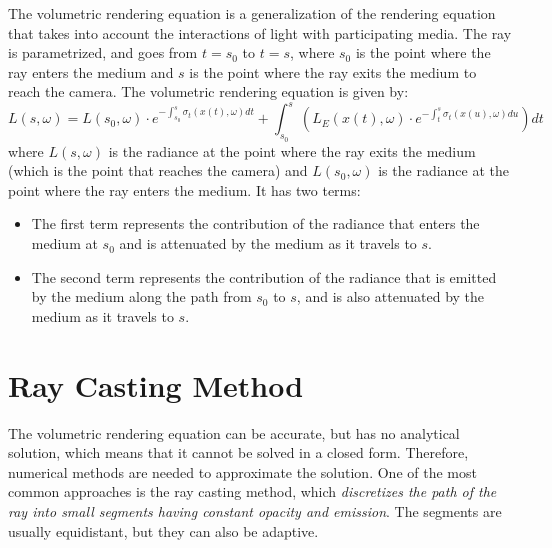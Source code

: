 The volumetric rendering equation is a generalization of the rendering equation that takes into account the interactions of light with participating media. The ray is parametrized, and goes from $t=s_0$ to $t=s$, where $s_0$ is the point where the ray enters the medium and $s$ is the point where the ray exits the medium to reach the camera. The volumetric rendering equation is given by:
\begin{equation}\label{eq:volumetric_rendering_equation}
L(s,\omega) = L(s_0,\omega) \cdot e^{\displaystyle -\int_{s_0}^s \sigma_t(x(t), \omega) dt} + \int_{s_0}^s \left(L_E(x(t), \omega) \cdot e^{\displaystyle -\int_t^s \sigma_t(x(u), \omega) du} \right) dt
\end{equation}
where $L(s,\omega)$ is the radiance at the point where the ray exits the medium (which is the point that reaches the camera) and $L(s_0,\omega)$ is the radiance at the point where the ray enters the medium. It has two terms:
\begin{itemize}
    \item The first term represents the contribution of the radiance that enters the medium at $s_0$ and is attenuated by the medium as it travels to $s$.
    \item The second term represents the contribution of the radiance that is emitted by the medium along the path from $s_0$ to $s$, and is also attenuated by the medium as it travels to $s$.
\end{itemize}

\section{Ray Casting Method}

The volumetric rendering equation can be accurate, but has no analytical solution, which means that it cannot be solved in a closed form. Therefore, numerical methods are needed to approximate the solution. One of the most common approaches is the ray casting method, which \emph{discretizes the path of the ray into small segments having constant opacity and emission}. The segments are usually equidistant, but they can also be adaptive.

